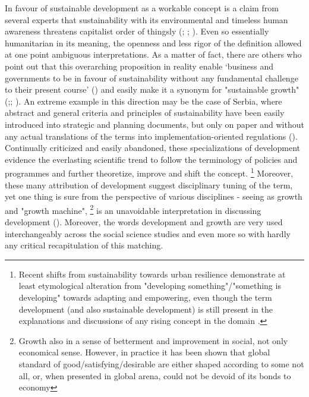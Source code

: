 \documentclass[11pt]{report}
\begin{document}
In favour of sustainable development as a workable concept is a claim from several experts that sustainability with its environmental and timeless human awareness threatens capitalist order of thingsly 
(\href{Middleton}{\cite{MiddletonEtAl1993????}}; \href{Christie}{\cite{ChristieAndWarburton2001????}}; \href{Hopwood}{\cite{HopwoodEtAl2005????}}).
Even so essentially humanitarian in its meaning, the openness and less rigor of the definition allowed at one point ambiguous interpretations.
As a matter of fact, there are others who point out that this overarching proposition in reality enable ‘business and governments to be in favour of sustainability without any fundamental challenge to their present course’ (\href{Hopwood}{\cite{HopwoodEtAl2005????}}) and easily make it a synonym for "sustainable growth" (\href{Daly}{\cite{Daly1993????}};\href{Rees}{\cite{Rees1998????}}; \href{Dollar}{\cite{DollarAndKraay2000????}}).
An extreme example in this direction may be the case of Serbia, where abstract and general criteria and principles of sustainability have been easily introduced into strategic and planning documents, but only on paper and without any actual translations of the terms into implementation-oriented regulations (\href{Vujosevic}{\cite{VujosevicEtAl.2012}}). 
\\


Continually criticized and easily abandoned, these specializations of development evidence the everlasting scientific trend to follow the terminology of policies and programmes and further theoretize, improve and shift the concept.
\footnote{Recent shifts from sustainability towards urban resilience  demonstrate at least etymological alteration from "developing something"/"something is developing" towards adapting and empowering, even though the term development (and also sustainable development) is still present in the explanations and discussions of any rising concept in the domain {\cite{ref web of science}}.}
Moreover, these many attribution of development suggest disciplinary tuning of the term, yet one thing is sure from the perspective of various disciplines - seeing as growth and "growth machine", \footnote{Growth also in a sense of betterment and improvement in social, not only economical sense.
However, in practice it has been shown that global standard of good/satisfying/desirable are either shaped according to some not all, or, when presented in global arena, could not be devoid of its bonds to economy} 
is an unavoidable interpretation in discussing development (\href{Gottdiener}{\cite{Gottdiener1994}}).
Moreover, the words development and growth are very used interchangeably across the social science studies and even more so with hardly any critical recapitulation of this matching.
\\
\end{document}
